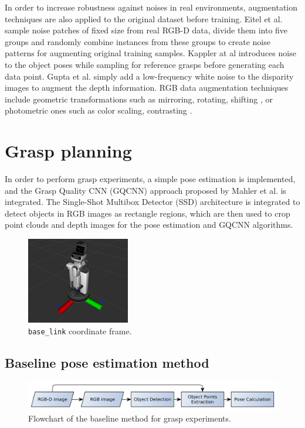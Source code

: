 \documentclass[runningheads]{../llncs}
\begin{document}
In order to increase robustness against noises in real environments, augmentation techniques are also applied to the
original dataset before training. Eitel et al. \cite{Eitel2015} sample noise patches of fixed size from real RGB-D
data, divide them into five groups and randomly combine instances from these groups to create noise patterns for
augmenting original training samples. Kappler at al \cite{Kappler2015} introduces noise to the object poses while
sampling for reference grasps before generating each data point. Gupta et al. \cite{Gupta2014RGBDFeatures} simply add a
low-frequency white noise to the disparity images to augment the depth information. RGB data augmentation techniques
include geometric transformations such as mirroring, rotating, shifting \cite{Gu2018}, or photometric ones such as color
scaling, contrasting \cite{Eigen2015}.

\section{Grasp planning} \label{sec:method}

In order to perform grasp experiments, a simple pose estimation is implemented, and the Grasp Quality CNN (GQCNN)
approach proposed by Mahler et al. \cite{mahler2017} is integrated. The Single-Shot Multibox Detector (SSD)
\cite{Liu2016SSD} architecture is integrated to detect objects in RGB images as rectangle regions, which are then used
to crop point clouds and depth images for the pose estimation and GQCNN algorithms.

\begin{figure}[h!]
    \centering
    \includegraphics[width=0.4\textwidth]{base_link_frame}
    \caption{\texttt{base\_link} coordinate frame.}
    \label{fig:base_link_frame}
\end{figure}

\subsection{Baseline pose estimation method} \label{sub:method_baseline}
\begin{figure}[h!]
    \centering
    \includegraphics[width=\textwidth]{grasp_plan_pose_estimation}
    \caption{Flowchart of the baseline method for grasp experiments.}
    \label{fig:grasp_plan_baseline}
\end{figure}
\end{document}
